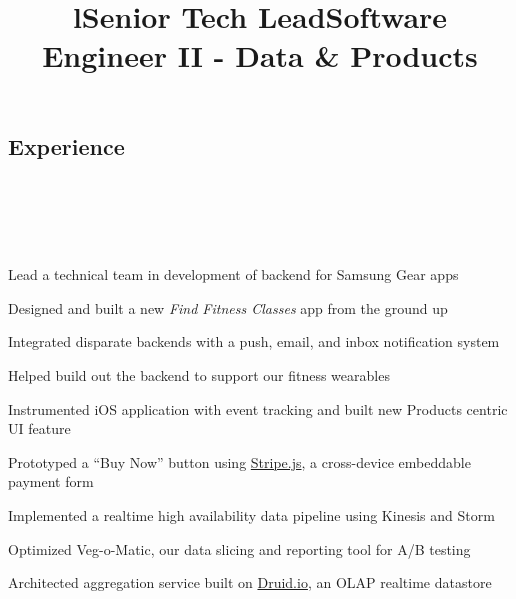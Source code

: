 \documentclass[12pt, tweaklist, line]{res}
\let\tempone\itemize
\let\temptwo\enditemize
\renewenvironment{itemize}{\tempone\vspace{-.15in}\setlength{\topsep}{0pt}\setlength{\itemsep}{3pt}\vspace{-.15in}}{\temptwo}
\begin{document}

\begin{resume}

\section{Experience}
\begin{format}
  \\
  \title{l}\\
  \body\\
\end{format}

\title{Senior Tech Lead}
\begin{position}
\begin{itemize}
\item Lead a technical team in development of backend for Samsung Gear apps
\item Designed and built a new \textit{Find Fitness Classes} app from the ground up
\item Integrated disparate backends with a push, email, and inbox notification system
\item Helped build out the backend to support our fitness wearables
\end{itemize}
\end{position}

\title{Software Engineer II - Data \& Products}
\begin{position}
\begin{itemize}
\item Instrumented iOS application with event tracking and built new Products centric UI feature
\item Prototyped a ``Buy Now'' button using \href{https://stripe.com/}{Stripe.js}, a cross-device embeddable payment form
\item Implemented a realtime high availability data pipeline using Kinesis and Storm
\item Optimized Veg-o-Matic, our data slicing and reporting tool for A/B testing
\item Architected aggregation service built on \href{http://druid.io/}{Druid.io}, an OLAP realtime datastore
\end{itemize}
\end{position}


\end{resume}
\end{document}
